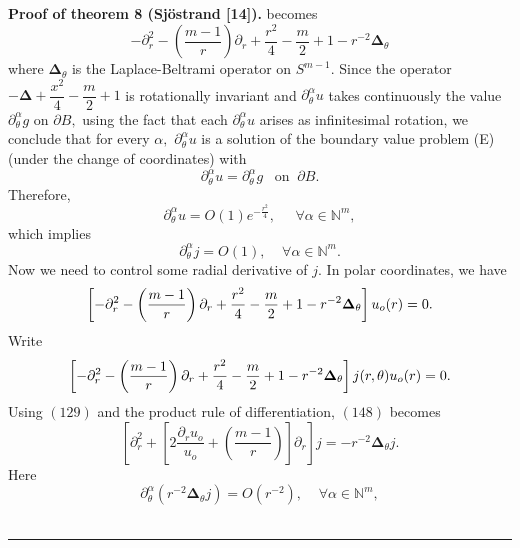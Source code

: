 \documentclass{article}
\newenvironment{proof}[1][Proof]{\noindent\textbf{#1.} }{\ \rule{0.5em}{0.5em}}
\begin{document}
\begin{proof}[{Proof of theorem 8 (Sj\"{o}strand [14])}]
becomes 
\begin{equation}
-\partial _{r}^{2}-\left( \dfrac{m-1}{r}\right) \partial _{r}+\dfrac{r^{2}}{4%
}-\dfrac{m}{2}+1-r^{-2}\mathbf{\Delta }_{\theta }
\end{equation}%
where $\mathbf{\Delta }_{\theta }$ is the Laplace-Beltrami operator on $%
S^{m-1}.$  Since the operator $\mathbf{-\Delta +}\dfrac{x^{2}}{4}-\dfrac{m}{2%
}+1$ is rotationally invariant and $\partial _{\theta }^{\alpha }u$ takes
continuously the value $\partial _{\theta }^{\alpha }g$ on $\partial B,$
using the fact that each $\partial _{\theta }^{\alpha }u$ arises as
infinitesimal rotation, we conclude that for every $\alpha ,$ $\partial
_{\theta }^{\alpha }u$ is a solution of the boundary value problem (E)
(under the change of coordinates) with 
\begin{equation}
\partial _{\theta }^{\alpha }u=\partial _{\theta }^{\alpha }g\;\;\;\text{on}%
\;\;\partial B.
\end{equation}%
Therefore, 
\begin{equation}
\partial _{\theta }^{\alpha }u=O(1)e^{-\tfrac{r^{2}}{4}},\;\;\;\;\;\forall
\alpha \in \mathbb{N}^{m},
\end{equation}%
which implies 
\begin{equation}
\partial _{\theta }^{\alpha }j=O(1),\;\;\;\;\forall \alpha \in \mathbb{N}%
^{m}.
\end{equation}%
Now we need to control some radial derivative of $j.$ In polar coordinates,
we have 
\begin{equation}
\left[ -\partial _{r}^{2}-\left( \dfrac{m-1}{r}\right) \partial _{r}+\dfrac{%
r^{2}}{4}-\dfrac{m}{2}+1-r^{-2}\mathbf{\Delta }_{\theta }\right] u_{o}(r)=0.
\end{equation}%
Write%
\begin{equation}
\left[ -\partial _{r}^{2}-\left( \dfrac{m-1}{r}\right) \partial _{r}+\dfrac{%
r^{2}}{4}-\dfrac{m}{2}+1-r^{-2}\mathbf{\Delta }_{\theta }\right] j(r,\theta
)u_{o}(r)=0.
\end{equation}%
Using $(129)$ and the product rule of differentiation, $(148)$ becomes \ 
\begin{equation}
\left[ \partial _{r}^{2}+\left[ 2\dfrac{\partial _{r}u_{o}}{u_{o}}+\left( 
\dfrac{m-1}{r}\right) \right] \partial _{r}\right] j=-r^{-2}\mathbf{\Delta }%
_{\theta }j.
\end{equation}%
Here 
\begin{equation}
\partial _{\theta }^{\alpha }\left( r^{-2}\mathbf{\Delta }_{\theta }j\right)
=O(r^{-2}),\;\;\;\;\forall \alpha \in \mathbb{N}^{m},

\end{equation}
\end{proof}
\end{document}
